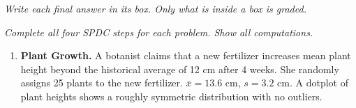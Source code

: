 \documentclass[10pt]{article}
\begin{document}
{\small\itshape Write each final answer in its box. Only what is inside a box is graded.}\par

\vspace{0.15in}

\textit{Complete all four SPDC steps for each problem. Show all computations.}

\begin{enumerate}

\item \textbf{Plant Growth.} \quad
A botanist claims that a new fertilizer increases mean plant height beyond the historical
average of 12 cm after 4 weeks. She randomly assigns 25 plants to the new fertilizer.
$\bar x = 13.6$ cm, $s = 3.2$ cm. A dotplot of plant heights shows a roughly symmetric
distribution with no outliers.


\end{enumerate}
\end{document}
